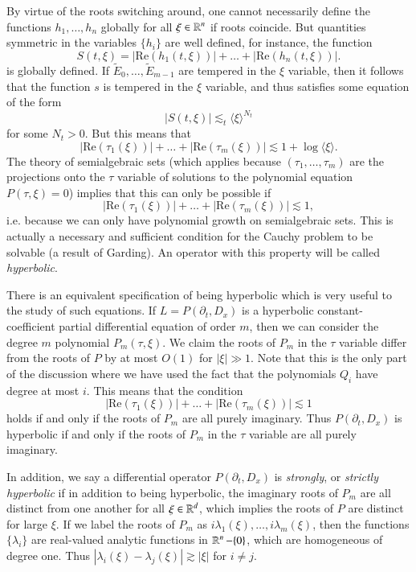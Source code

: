 By virtue of the roots switching around, one cannot necessarily define the functions $h_1,\dots,h_n$ globally for all $\xi \in \operatorname{\mathbb{R}}^n$ if roots coincide. But quantities symmetric in the variables $\{ h_i \}$ are well defined, for instance, the function
%
\[ S(t,\xi) = |\text{Re}(h_1(t,\xi))| + \dots + |\text{Re}(h_n(t,\xi))|. \]
%
is globally defined. If $\tilde{E}_0,\dots,\tilde{E}_{m-1}$ are tempered in the $\xi$ variable, then it follows that the function $s$ is tempered in the $\xi$ variable, and thus satisfies some equation of the form
%
\[ |S(t,\xi)| \lesssim_t \langle \xi \rangle^{N_t} \]
%
for some $N_t > 0$. But this means that
%
\[ |\text{Re}(\tau_1(\xi))| + \dots + |\text{Re}(\tau_m(\xi))| \lesssim 1 + \log \langle \xi \rangle. \]
%
The theory of semialgebraic sets (which applies because $(\tau_1,\dots,\tau_m)$ are the projections onto the $\tau$ variable of solutions to the polynomial equation $P(\tau,\xi) = 0$) implies that this can only be possible if
%
\[ |\text{Re}(\tau_1(\xi))| + \dots + |\text{Re}(\tau_m(\xi))| \lesssim 1, \]
%
i.e. because we can only have polynomial growth on semialgebraic sets. This is actually a necessary and sufficient condition for the Cauchy problem to be solvable (a result of Garding). An operator with this property will be called \emph{hyperbolic}.

There is an equivalent specification of being hyperbolic which is very useful to the study of such equations. If $L = P(\partial_t, D_x)$ is a hyperbolic constant-coefficient partial differential equation of order $m$, then we can consider the degree $m$ polynomial $P_m(\tau,\xi)$. We claim the roots of $P_m$ in the $\tau$ variable differ from the roots of $P$ by at most $O(1)$ for $|\xi| \gg 1$. Note that this is the only part of the discussion where we have used the fact that the polynomials $Q_i$ have degree at most $i$. This means that the condition
%
\[ |\text{Re}(\tau_1(\xi))| + \dots + |\text{Re}(\tau_m(\xi))| \lesssim 1 \]
%
holds if and only if the roots of $P_m$ are all purely imaginary. Thus $P(\partial_t, D_x)$ is hyperbolic if and only if the roots of $P_m$ in the $\tau$ variable are all purely imaginary.

In addition, we say a differential operator $P(\partial_t, D_x)$ is \emph{strongly}, or \emph{strictly hyperbolic} if in addition to being hyperbolic, the imaginary roots of $P_m$ are all distinct from one another for all $\xi \in \operatorname{\mathbb{R}}^d$, which implies the roots of $P$ are distinct for large $\xi$. If we label the roots of $P_m$ as $i \lambda_1(\xi), \dots, i \lambda_m(\xi)$, then the functions $\{ \lambda_i \}$ are real-valued analytic functions in $\operatorname{\mathbb{R}}^n - \{ 0 \}$, which are homogeneous of degree one. Thus $|\lambda_i(\xi) - \lambda_j(\xi)| \gtrsim |\xi|$ for $i \neq j$.

